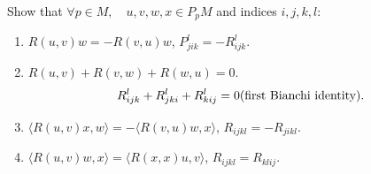 \begin{problem}\label{prob:14}
Show that $\forall p \in M, \quad u, v, w, x \in P_pM$ and indices $i,j,k,l$:
\begin{enumerate}[label=(\arabic*), ref=Problem \theproblem~(\arabic*)]
\item \label{prob:14.1} $R(u,v)w = -R(v,u)w$, $P_{jik}^l = -R_{ijk}^l$.
\item \label{prob:14.2} $R(u,v) + R(v,w) + R(w,u) = 0$.
\[
R_{ijk}^l + R_{jki}^l + R_{kij}^l = 0 \hfill \text{(first Bianchi identity)}.
\]
\item \label{prob:14.3} $\langle R(u,v)x, w \rangle = -\langle R(v,u)w, x \rangle$, $R_{ijkl} = -R_{jikl}$.
\item \label{prob:14.4} $\langle R(u,v)w, x \rangle = \langle R(x,x)u, v \rangle$, $R_{ijkl} = R_{klij}$.
\end{enumerate}
\end{problem}